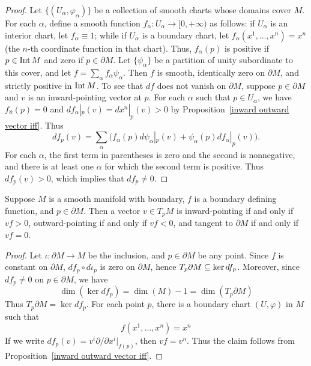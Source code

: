 \begin{proof}
Let $\{(U_\alpha,\varphi_\alpha)\}$ be a collection of smooth charts whose domains cover $M$. For each $\alpha$, define a smooth function $f_\alpha:U_\alpha\to[0,+\infty)$ as follows: if $U_\alpha$ is an interior chart, let $f_\alpha\equiv1$; while if $U_\alpha$ is a boundary chart, let $f_\alpha(x^1,\dots,x^{n})=x^n$ (the $n$-th coordinate function in that chart). Thus, $f_\alpha(p)$ is positive if $p\in\mathrm{Int}\, M$ and zero if $p\in\partial M$. Let $\{\psi_\alpha\}$ be a partition of unity subordinate to this cover, and let $f=\sum_\alpha f_\alpha\psi_\alpha$. Then $f$ is smooth, identically zero on $\partial M$, and strictly positive in $\mathrm{Int}\, M$. To see that $df$ does not vanish on $\partial M$, suppose $p\in\partial M$ and $v$ is an inward-pointing vector at $p$. For each $\alpha$ such that $p\in U_\alpha$, we have $f_\aleph(p)=0$ and $df_\alpha|_p(v)=dx^n|_p(v)>0$ by Proposition~\ref{inward outward vector iff}. Thus
\[df_p(v)=\sum_\alpha\big(f_\alpha(p)d\psi_\alpha|_p(v)+\psi_\alpha(p)df_\alpha|_p(v)\big).\]
For each $\alpha$, the first term in parentheses is zero and the second is nonnegative, and there is at least one $\alpha$ for which the second term is positive. Thus $df_p(v)>0$, which implies that $df_p\neq0$.
\end{proof}
\begin{proposition}\label{inward derivative crit}
Suppose $M$ is a smooth manifold with boundary, $f$ is a boundary defining function, and $p\in\partial M$. Then a vector $v\in T_pM$ is inward-pointing if and only if $vf>0$, outward-pointing if and only if $vf<0$, and tangent to $\partial M$ if and only if $vf=0$.
\end{proposition}
\begin{proof}
Let $\iota:\partial M\to M$ be the inclusion, and $p\in\partial M$ be any point. Since $f$ is constant on $\partial M$, $df_p\circ d\iota_p$ is zero on $\partial M$, hence $T_p\partial M\subseteq\ker df_p$. Moreover, since $df_p\neq 0$ on $p\in\partial M$, we have
\[\dim(\ker df_p)=\dim(M)-1=\dim(T_p\partial M)\]
Thus $T_p\partial M=\ker df_p$. For each point $p$, there is a boundary chart $(U,\varphi)$ in $M$ such that 
\[f(x^1,\dots,x^n)=x^n\]
If we write $df_p(v)=v^i\partial/\partial x^i|_{f(p)}$, then $vf=v^n$. Thus the claim follows from Proposition~\ref{inward outward vector iff}.
\end{proof}
